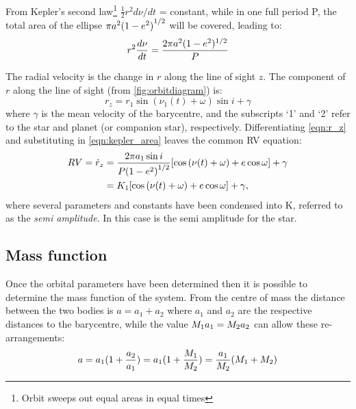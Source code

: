 From Kepler's second law\footnote{Orbit sweeps out equal areas in equal times} \(\frac{1}{2} r^{2} d\nu/dt\) = constant, while in one full period P, the total area of the ellipse \(\pi a^{2}{(1 - {e}^{2})}^{1/2} \) will be covered, leading to:
\begin{equation}
    r^{2} \frac{d\nu}{dt} = \frac{2\pi a^{2}(1 - {e}^{2})^{1/2}}{P} \label{eqn:kepler_area}
\end{equation}

The radial velocity is the change in $r$ along the line of sight $z$.
The component of $r$ along the line of sight (from \cref{fig:orbitdiagram}) is:
\begin{equation}
    r_z =  r_1 \sin{(\nu_1(t) + \omega)}\sin{i} + \gamma \label{eqn:r_z}
\end{equation}
where \(\gamma\) is the mean velocity of the barycentre, and the subscripts `1' and `2' refer to the star and planet (or companion star), respectively.
Differentiating \cref{eqn:r_z} and substituting in \cref{eqn:kepler_area} leaves the common {RV} equation:
\begin{align}
    {RV} = \dot{r}_z &= \frac{2 \pi a_1 \sin{i}}{P{(1 - {e}^{2})}^{1/2}} [\cos{(\nu(t) + \omega)} + e\cos{\omega}] + \gamma  \label{eqn:rv_equation} \\
     &= {K}_{1} [\cos{(\nu(t) + \omega)} + e\cos{\omega}] + \gamma,
\end{align}
where several parameters and constants have been condensed into $\textrm{K}$, referred to as the \emph{semi amplitude}.
In this case \Kone{} is the semi amplitude for the star.


\subsection{Mass function}
Once the orbital parameters have been determined then it is possible to determine the mass function of the system.
From the centre of mass the distance between the two bodies is \(a = a_1 + a_2\) where $a_1$ and $a_2$ are the respective distances to the barycentre, while the value \({M}_{1} a_1 = {M}_{2} a_2\) can allow these re-arrangements:
\begin{equation}
    a = a_{1} (1 + \frac{a_{2}}{a_{1}}) = a_{1}(1 + \frac{{M}_{1}}{{M}_{2}}) = \frac{a_{1}}{{M}_{2}} ({M}_{1} + {M}_{2})
\end{equation}

